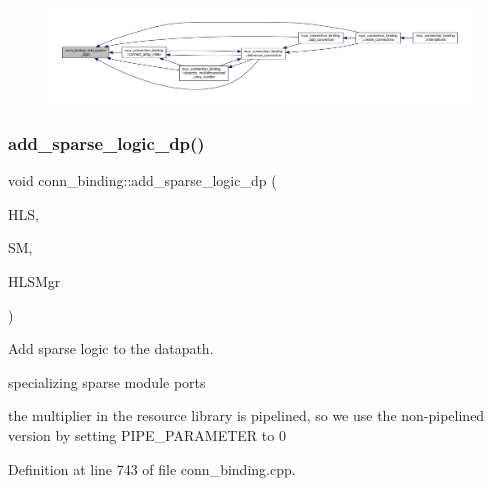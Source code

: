 \nopagebreak
\begin{figure}[H]
\begin{center}
\leavevmode
\includegraphics[width=350pt]{d2/db1/classconn__binding_ab42e47f8c1b558caf9029baed9c59705_icgraph}
\end{center}
\end{figure}
\mbox{\label{classconn__binding_a393ed99302e52c270d5756f789f2fc76}} 
\subsubsection{\texorpdfstring{add\+\_\+sparse\+\_\+logic\+\_\+dp()}{add\_sparse\_logic\_dp()}}
{\footnotesize\ttfamily void conn\+\_\+binding\+::add\+\_\+sparse\+\_\+logic\+\_\+dp (\begin{DoxyParamCaption}\item[{const \hyperlink{hls_8hpp_a75d0c73923d0ddfa28c4843a802c73a7}{hls\+Ref}}]{H\+LS,  }\item[{const \hyperlink{structural__manager_8hpp_ab3136f0e785d8535f8d252a7b53db5b5}{structural\+\_\+manager\+Ref}}]{SM,  }\item[{const \hyperlink{hls__manager_8hpp_acd3842b8589fe52c08fc0b2fcc813bfe}{H\+L\+S\+\_\+manager\+Ref}}]{H\+L\+S\+Mgr }\end{DoxyParamCaption})\hspace{0.3cm}{\ttfamily [protected]}}



Add sparse logic to the datapath. 

specializing sparse module ports

the multiplier in the resource library is pipelined, so we use the non-\/pipelined version by setting P\+I\+P\+E\+\_\+\+P\+A\+R\+A\+M\+E\+T\+ER to 0 

Definition at line 743 of file conn\+\_\+binding.\+cpp.




